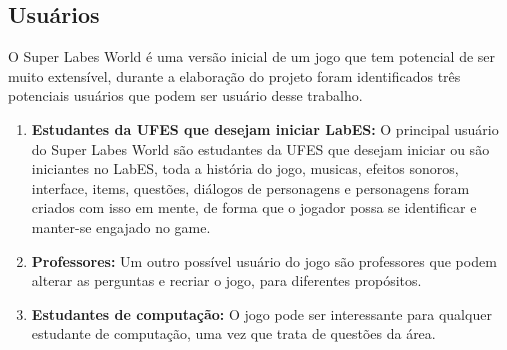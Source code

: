 \subsection{Usuários}
\label{sec:usuarios}
O Super Labes World é uma versão inicial de um jogo que tem potencial de ser muito extensível, durante a elaboração do projeto foram identificados três potenciais usuários que podem ser usuário desse trabalho.

\begin{enumerate}
    \item \textbf{Estudantes da UFES que desejam iniciar LabES:} O principal usuário do Super Labes World são estudantes da UFES que desejam iniciar ou são iniciantes no LabES, toda a história do jogo, musicas, efeitos sonoros, interface, items, questões, diálogos de personagens e personagens foram criados com isso em mente, de forma que o jogador possa se identificar e manter-se engajado no game. 
    \item \textbf{Professores:} Um outro possível usuário do jogo são professores que podem alterar as perguntas e recriar o jogo, para diferentes propósitos. 
    \item \textbf{Estudantes de computação:} O jogo pode ser interessante para qualquer estudante de computação, uma vez que trata de questões da área.
\end{enumerate}


